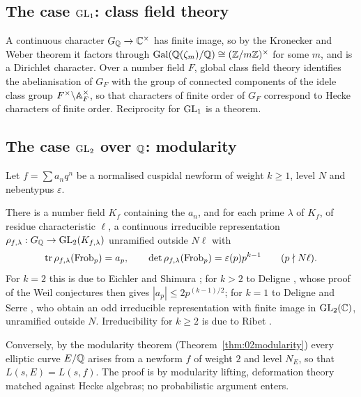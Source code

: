 \subsection{The case \texorpdfstring{$\mathrm{GL}_1$}{GL1}: class field theory}

A continuous character $G_{\mathbb{Q}}\to\mathbb{C}^\times$ has finite image, so by the Kronecker and Weber theorem it factors through $\operatorname{Gal}(\mathbb{Q}(\zeta_m)/\mathbb{Q})\cong(\mathbb{Z}/m\mathbb{Z})^\times$ for some $m$, and is a Dirichlet character. Over a number field $F$, global class field theory identifies the abelianisation of $G_F$ with the group of connected components of the idele class group $F^\times\backslash\mathbb{A}_F^\times$, so that characters of finite order of $G_F$ correspond to Hecke characters of finite order. Reciprocity for $\mathrm{GL}_1$ is a theorem.

\subsection{The case \texorpdfstring{$\mathrm{GL}_2$}{GL2} over \texorpdfstring{$\mathbb{Q}$}{Q}: modularity}

Let $f=\sum a_nq^n$ be a normalised cuspidal newform of weight $k\ge1$, level $N$ and nebentypus $\varepsilon$.

\begin{theorem}\label{thm:ch3ES}
There is a number field $K_f$ containing the $a_n$, and for each prime $\lambda$ of $K_f$, of residue characteristic $\ell$, a continuous irreducible representation $\rho_{f,\lambda}:G_{\mathbb{Q}}\to\mathrm{GL}_2(K_{f,\lambda})$ unramified outside $N\ell$ with
\[
\operatorname{tr}\rho_{f,\lambda}(\operatorname{Frob}_p)=a_p,\qquad \det\rho_{f,\lambda}(\operatorname{Frob}_p)=\varepsilon(p)p^{k-1}\qquad(p\nmid N\ell).
\]
For $k=2$ this is due to Eichler \cite{eichler1954} and Shimura \cite{shimura1971}; for $k>2$ to Deligne \cite{deligne1971}, whose proof of the Weil conjectures \cite{deligne1974} then gives $|a_p|\le2p^{(k-1)/2}$; for $k=1$ to Deligne and Serre \cite{deligneserre1974}, who obtain an odd irreducible representation with finite image in $\mathrm{GL}_2(\mathbb{C})$, unramified outside $N$. Irreducibility for $k\ge2$ is due to Ribet \cite{ribet1977}.
\end{theorem}

Conversely, by the modularity theorem (Theorem~\ref{thm:02modularity}) every elliptic curve $E/\mathbb{Q}$ arises from a newform $f$ of weight $2$ and level $N_E$, so that $L(s,E)=L(s,f)$. The proof is by modularity lifting, deformation theory matched against Hecke algebras; no probabilistic argument enters.

